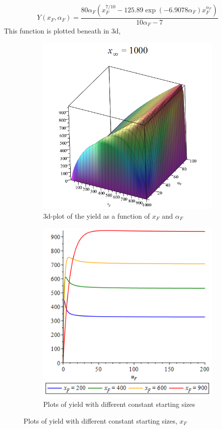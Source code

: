 \documentclass{article}
\numberwithin{equation}{section} %
\begin{document}
\begin{equation}%
	Y(x_F,\alpha_F) = \dfrac{80\alpha_F\left(x_F^{7/10}-125.89\exp(-6.9078\alpha_F)x_F^{\alpha_F}\right)}{10\alpha_F-7}
\end{equation}
This function is plotted beneath in 3d,
\begin{figure}[h]\label{fig:ex3p3a4}
    \begin{subfigure}[t!]{0.5\textwidth}
        \includegraphics[width=0.9\linewidth]{exercises/ex3p3} 
        \caption{3d-plot of the yield as a function of $x_F$ and $\alpha_F$}
        \label{fig:ex3p4}
    \end{subfigure}
\begin{subfigure}[t!]{0.5\textwidth}
        \centering
        \includegraphics[width=0.9\linewidth]{exercises/ex3p4}
        \caption{Plots of yield with different constant starting sizes }
    \end{subfigure}
    \caption{Plots of yield with different constant starting sizes, $x_F$} 
    \label{fig:ex3p4}
\end{figure}
\end{document}
